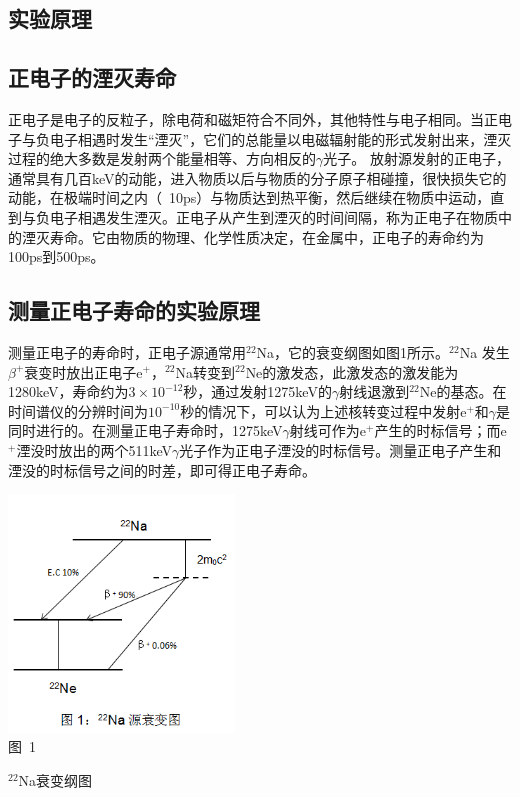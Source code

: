 \documentclass[a4paper,10.0pt,twoside]{npr}
\begin{document}
\begin{multicols}{2}

\section{实验原理}    %
\vspace*{-1mm}
\song\wuhao
\subsection{正电子的湮灭寿命}
正电子是电子的反粒子，除电荷和磁矩符合不同外，其他特性与电子相同。当正电子与负电子相遇时发生“湮灭”，它们的总能量以电磁辐射能的形式发射出来，湮灭过程的绝大多数是发射两个能量相等、方向相反的$\gamma$光子。
放射源发射的正电子，通常具有几百keV的动能，进入物质以后与物质的分子原子相碰撞，很快损失它的动能，在极端时间之内（~10ps）与物质达到热平衡，然后继续在物质中运动，直到与负电子相遇发生湮灭。正电子从产生到湮灭的时间间隔，称为正电子在物质中的湮灭寿命。它由物质的物理、化学性质决定，在金属中，正电子的寿命约为100ps到500ps。

\subsection{测量正电子寿命的实验原理}

测量正电子的寿命时，正电子源通常用$^{22}$Na，它的衰变纲图如图1所示。$^{22}$Na 发生$\beta^{+}$衰变时放出正电子e$^{+}$，$^{22}$Na转变到$^{22}$Ne的激发态，此激发态的激发能为1280keV，寿命约为$3\times10^{-12}$秒，通过发射1275keV的$\gamma$射线退激到$^{22}$Ne的基态。在时间谱仪的分辨时间为$10^{-10}$秒的情况下，可以认为上述核转变过程中发射e$^{+}$和$\gamma$是同时进行的。在测量正电子寿命时，1275keV$\gamma$射线可作为e$^{+}$产生的时标信号；而e$^{+}$湮没时放出的两个511keV$\gamma$光子作为正电子湮没的时标信号。测量正电子产生和湮没的时标信号之间的时差，即可得正电子寿命。
\begin{center}
   \includegraphics[width=0.45\textwidth]{1.png}
\\
\xiaowu\song 图~1\begin{minipage}[t]{75mm} \quad $^{22}$Na衰变纲图\\[-1mm]\wuhao
\end{minipage}
\end{center}


\end{multicols}
\end{document}
